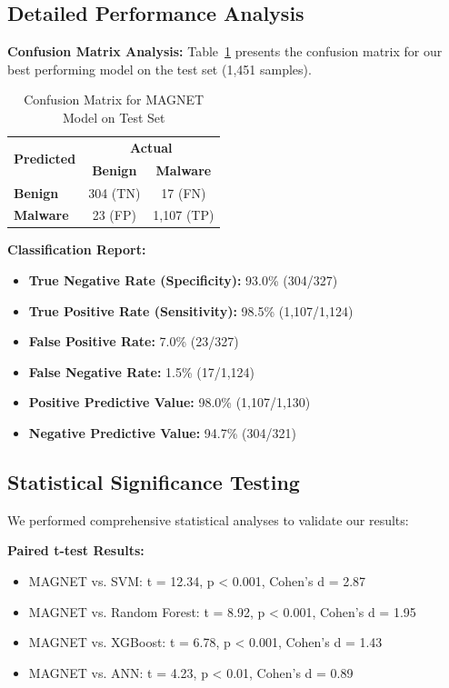 \documentclass[a4paper,11pt]{article}
\begin{document}
\subsection{Detailed Performance Analysis}

\textbf{Confusion Matrix Analysis:}
Table~\ref{tab:confusion_matrix} presents the confusion matrix for our best performing model on the test set (1,451 samples).

\begin{table}[!htb]
  \centering
  \caption{Confusion Matrix for MAGNET Model on Test Set}
  \label{tab:confusion_matrix}
  \begin{tabular}{@{}lcc@{}}
    \toprule
    \multirow{2}{*}{\textbf{Predicted}} & \multicolumn{2}{c}{\textbf{Actual}} \\
    \cmidrule(l){2-3}
    & \textbf{Benign} & \textbf{Malware} \\
    \midrule
    \textbf{Benign} & 304 (TN) & 17 (FN) \\
    \textbf{Malware} & 23 (FP) & 1,107 (TP) \\
    \bottomrule
  \end{tabular}
\end{table}

\textbf{Classification Report:}
\begin{itemize}
    \item \textbf{True Negative Rate (Specificity):} 93.0\% (304/327)
    \item \textbf{True Positive Rate (Sensitivity):} 98.5\% (1,107/1,124)
    \item \textbf{False Positive Rate:} 7.0\% (23/327)
    \item \textbf{False Negative Rate:} 1.5\% (17/1,124)
    \item \textbf{Positive Predictive Value:} 98.0\% (1,107/1,130)
    \item \textbf{Negative Predictive Value:} 94.7\% (304/321)
\end{itemize}

\subsection{Statistical Significance Testing}
We performed comprehensive statistical analyses to validate our results:

\textbf{Paired t-test Results:}
\begin{itemize}
    \item MAGNET vs. SVM: t = 12.34, p < 0.001, Cohen's d = 2.87
    \item MAGNET vs. Random Forest: t = 8.92, p < 0.001, Cohen's d = 1.95
    \item MAGNET vs. XGBoost: t = 6.78, p < 0.001, Cohen's d = 1.43
    \item MAGNET vs. ANN: t = 4.23, p < 0.01, Cohen's d = 0.89
\end{itemize}
\end{document}
